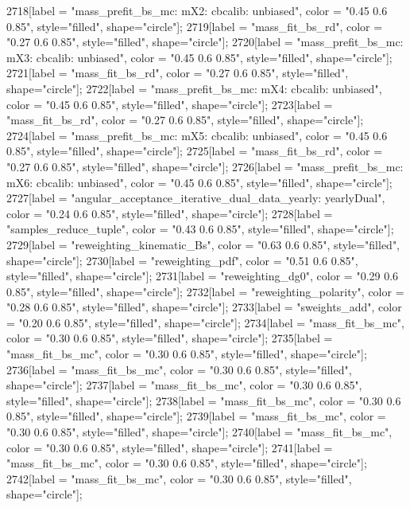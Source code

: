 {	2718[label = "mass_prefit_bs_mc\nmassbin: mX2\nmassmodel: cbcalib\ntrigger: unbiased", color = "0.45 0.6 0.85", style="filled", shape="circle"];
	2719[label = "mass_fit_bs_rd", color = "0.27 0.6 0.85", style="filled", shape="circle"];
	2720[label = "mass_prefit_bs_mc\nmassbin: mX3\nmassmodel: cbcalib\ntrigger: unbiased", color = "0.45 0.6 0.85", style="filled", shape="circle"];
	2721[label = "mass_fit_bs_rd", color = "0.27 0.6 0.85", style="filled", shape="circle"];
	2722[label = "mass_prefit_bs_mc\nmassbin: mX4\nmassmodel: cbcalib\ntrigger: unbiased", color = "0.45 0.6 0.85", style="filled", shape="circle"];
	2723[label = "mass_fit_bs_rd", color = "0.27 0.6 0.85", style="filled", shape="circle"];
	2724[label = "mass_prefit_bs_mc\nmassbin: mX5\nmassmodel: cbcalib\ntrigger: unbiased", color = "0.45 0.6 0.85", style="filled", shape="circle"];
	2725[label = "mass_fit_bs_rd", color = "0.27 0.6 0.85", style="filled", shape="circle"];
	2726[label = "mass_prefit_bs_mc\nmassbin: mX6\nmassmodel: cbcalib\ntrigger: unbiased", color = "0.45 0.6 0.85", style="filled", shape="circle"];
	2727[label = "angular_acceptance_iterative_dual_data_yearly\nangacc: yearlyDual", color = "0.24 0.6 0.85", style="filled", shape="circle"];
	2728[label = "samples_reduce_tuple", color = "0.43 0.6 0.85", style="filled", shape="circle"];
	2729[label = "reweighting_kinematic_Bs", color = "0.63 0.6 0.85", style="filled", shape="circle"];
	2730[label = "reweighting_pdf", color = "0.51 0.6 0.85", style="filled", shape="circle"];
	2731[label = "reweighting_dg0", color = "0.29 0.6 0.85", style="filled", shape="circle"];
	2732[label = "reweighting_polarity", color = "0.28 0.6 0.85", style="filled", shape="circle"];
	2733[label = "sweights_add", color = "0.20 0.6 0.85", style="filled", shape="circle"];
	2734[label = "mass_fit_bs_mc", color = "0.30 0.6 0.85", style="filled", shape="circle"];
	2735[label = "mass_fit_bs_mc", color = "0.30 0.6 0.85", style="filled", shape="circle"];
	2736[label = "mass_fit_bs_mc", color = "0.30 0.6 0.85", style="filled", shape="circle"];
	2737[label = "mass_fit_bs_mc", color = "0.30 0.6 0.85", style="filled", shape="circle"];
	2738[label = "mass_fit_bs_mc", color = "0.30 0.6 0.85", style="filled", shape="circle"];
	2739[label = "mass_fit_bs_mc", color = "0.30 0.6 0.85", style="filled", shape="circle"];
	2740[label = "mass_fit_bs_mc", color = "0.30 0.6 0.85", style="filled", shape="circle"];
	2741[label = "mass_fit_bs_mc", color = "0.30 0.6 0.85", style="filled", shape="circle"];
	2742[label = "mass_fit_bs_mc", color = "0.30 0.6 0.85", style="filled", shape="circle"];
}
